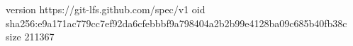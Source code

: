 version https://git-lfs.github.com/spec/v1
oid sha256:e9a171ac779cc7ef92da6cfebbbf9a798404a2b2b99e4128ba09c685b40fb38c
size 211367
